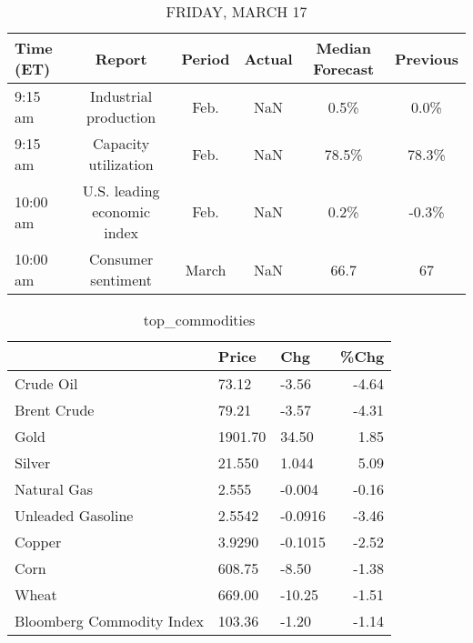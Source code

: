 \documentclass{article}%
\begin{document}
%


\begin{table}[htbp]%
\caption{FRIDAY, MARCH 17}%
\centering%
\begin{adjustbox}{width=1\textwidth}%
\begin{tabular}{lccccc}
\toprule
Time (ET) &                      Report & Period & Actual & Median Forecast & Previous \\
\midrule
  9:15 am &       Industrial production &   Feb. &    NaN &            0.5\% &     0.0\% \\
  9:15 am &        Capacity utilization &   Feb. &    NaN &           78.5\% &    78.3\% \\
 10:00 am & U.S. leading economic index &   Feb. &    NaN &            0.2\% &    -0.3\% \\
 10:00 am &          Consumer sentiment &  March &    NaN &            66.7 &       67 \\
\bottomrule
\end{tabular}
%
\end{adjustbox}%
\end{table}

%


\begin{table}[htbp]%
\caption{top\_commodities}%
\centering%
\begin{adjustbox}{width=1\textwidth}%
\begin{tabular}{lllr}
\toprule
                          &   Price &     Chg &  \%Chg \\
\midrule
               Crude Oil  &   73.12 &   -3.56 & -4.64 \\
             Brent Crude  &   79.21 &   -3.57 & -4.31 \\
                    Gold  & 1901.70 &   34.50 &  1.85 \\
                  Silver  &  21.550 &   1.044 &  5.09 \\
             Natural Gas  &   2.555 &  -0.004 & -0.16 \\
       Unleaded Gasoline  &  2.5542 & -0.0916 & -3.46 \\
                  Copper  &  3.9290 & -0.1015 & -2.52 \\
                    Corn  &  608.75 &   -8.50 & -1.38 \\
                   Wheat  &  669.00 &  -10.25 & -1.51 \\
Bloomberg Commodity Index &  103.36 &   -1.20 & -1.14 \\
\bottomrule
\end{tabular}
%
\end{adjustbox}%
\end{table}
\end{document}
